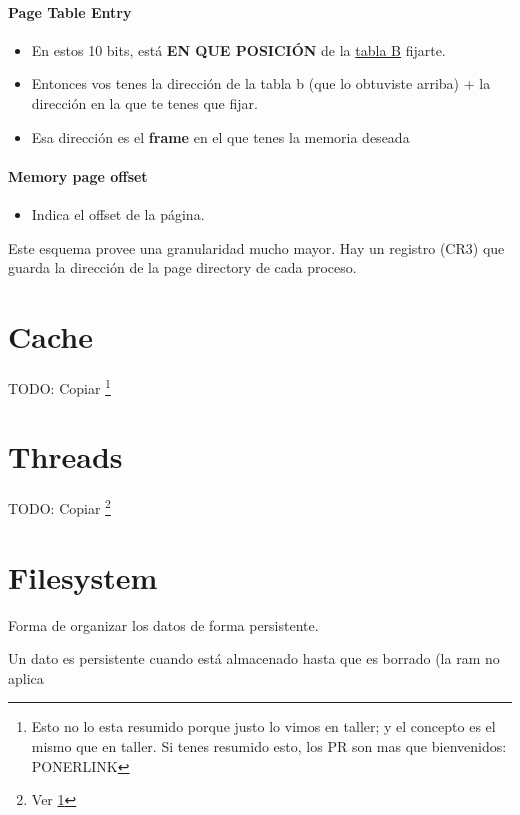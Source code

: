 \documentclass{article}
\begin{document}
\paragraph{Page Table Entry}\label{page-table-entry}

\begin{itemize}
\item
  En estos 10 bits, está \textbf{EN QUE POSICIÓN} de la \underline{tabla B}
  fijarte.
\item
  Entonces vos tenes la dirección de la tabla b (que lo obtuviste
  arriba) + la dirección en la que te tenes que fijar.
\item
  Esa dirección es el \textbf{frame} en el que tenes la memoria deseada
\end{itemize}

\paragraph{Memory page offset}\label{memory-page-offset}

\begin{itemize}
\item
  Indica el offset de la página.
\end{itemize}

Este esquema provee una granularidad mucho mayor. Hay un registro (CR3)
que guarda la dirección de la page directory de cada proceso.

\section{Cache}\label{cache}

TODO: Copiar \footnote{\label{notaTaller}Esto no lo esta resumido porque justo lo vimos en taller; y el concepto es el mismo que en taller. Si tenes resumido esto, los PR son mas que bienvenidos: PONERLINK}

\section{Threads}\label{threads}
 TODO: Copiar \footnote{Ver \cref{notaTaller}}


\section{Filesystem}\label{filesystem}

Forma de organizar los datos de forma persistente.

Un dato es persistente cuando está almacenado hasta que es borrado (la
ram no aplica
\end{document}
